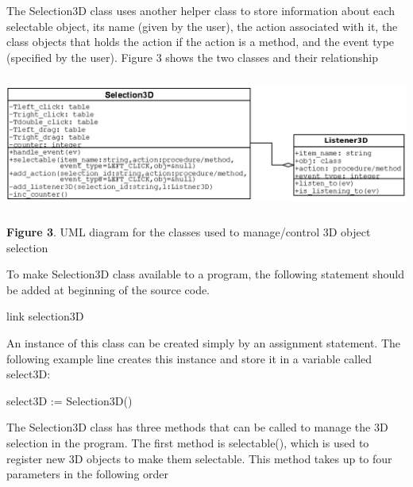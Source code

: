 \documentclass[letterpaper]{article}
\begin{document}
\bigskip


\bigskip


\bigskip

The \textsf{Selection3D} class uses another helper class to store
information about each selectable object, its name (given by the
user), the action associated with it, the class objects that holds the
action if the action is a method, and the event type (specified by the
user). Figure 3 shows the two classes and their relationship

\bigskip

\begin{center}
\includegraphics[width=6in,height=1.75in]{utr9/utr9-img035.png}
\end{center}
\begin{center}
\begin{minipage}{5.1264in}
{
\textbf{Figure 3}. UML diagram for the classes used to manage/control 3D object selection}
\end{minipage}
\end{center}

\bigskip

To make Selection3D class available to a program, the following
statement should be added at beginning of the source code.


\bigskip

{\sffamily
link selection3D}


\bigskip

An instance of this class can be created simply by an assignment
statement. The following example line creates this instance and store
it in a variable called \textsf{select3D:}

\bigskip

{\sffamily
select3D := Selection3D()}


\bigskip

The \textsf{Selection3D} class has three methods that can be called
to manage the 3D selection in the program. The first method is
\textsf{selectable()}, which is used to register new 3D objects to
make them selectable. This method takes up to four parameters in the
following order
\end{document}
